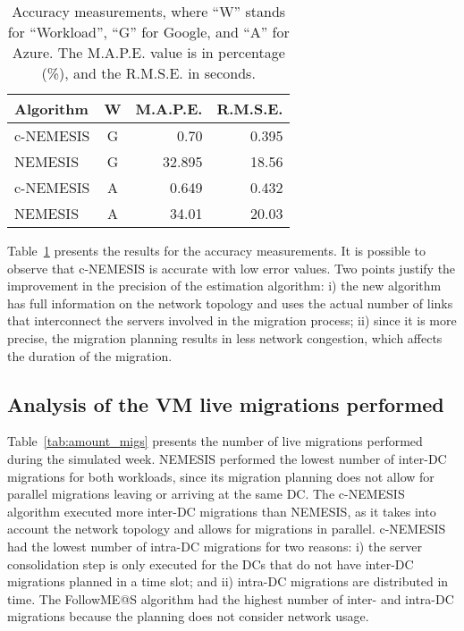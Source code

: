 \begin{table}[!htpb]
  \caption{Accuracy measurements, where ``W'' stands for ``Workload'', ``G'' for Google, and ``A'' for Azure. The M.A.P.E. value is in percentage (\%), and the R.M.S.E. in seconds. }\label{tab:accuracy} \centering
\begin{tabular}{|l|c|r|r|}
  \hline
  \textbf{Algorithm} & \textbf{W}  & \textbf{M.A.P.E.} & \textbf{R.M.S.E.}\\
  \hline
  c-NEMESIS  & G & 0.70  & 0.395 \\
  \hline
  NEMESIS & G & 32.895 & 18.56 \\
  \hline
  c-NEMESIS  & A & 0.649  & 0.432 \\
  \hline
  NEMESIS & A & 34.01 & 20.03 \\
  \hline
\end{tabular}
\end{table}



Table~\ref{tab:accuracy} presents the results for the accuracy measurements. It is possible to observe that c-NEMESIS is accurate with low error values. Two points justify the improvement in the precision of the estimation algorithm: i) the new algorithm has full information on the network topology and uses the actual number of links that interconnect the servers involved in the migration process; ii) since it is more precise, the migration planning results in less network congestion, which affects the duration of the migration.


\subsection{Analysis of the VM live migrations performed}


Table~\ref{tab:amount_migs} presents the number of live migrations performed during the simulated week. NEMESIS performed the lowest number of inter-DC migrations for both workloads, since its migration planning does not allow for parallel migrations leaving or arriving at the same DC. The c-NEMESIS algorithm executed more inter-DC migrations than NEMESIS, as it takes into account the network topology and allows for migrations in parallel. c-NEMESIS had the lowest number of intra-DC migrations for two reasons: i) the server consolidation step is only executed for the DCs that do not have inter-DC migrations planned in a time slot; and ii) intra-DC migrations are distributed in time. The FollowME@S algorithm had the highest number of inter- and intra-DC migrations because the planning does not consider network usage.

